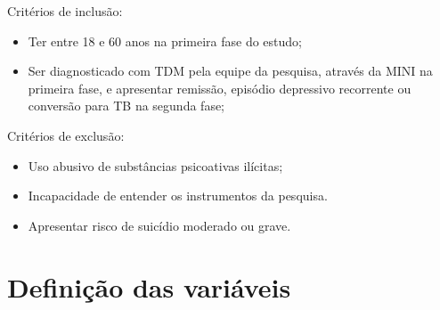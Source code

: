 \documentclass[chapter=TITLE,
               oneside,
               12pt,
               a4paper,
               english,
               brazil]{abntex2}    %
\begin{document}
            Critérios de inclusão:

            \begin{itemize}

                \item Ter entre 18 e 60 anos na primeira fase do estudo;

                \item Ser diagnosticado com TDM pela equipe da pesquisa,
                através da MINI na primeira fase, e apresentar remissão,
                episódio depressivo recorrente ou conversão para TB na segunda fase;

            \end{itemize}

            Critérios de exclusão:

            \begin{itemize}

                \item Uso abusivo de substâncias psicoativas ilícitas;

                \item Incapacidade de entender os instrumentos da pesquisa.

                \item Apresentar risco de suicídio moderado ou grave.

    \end{itemize}

    \section{Definição das variáveis}\label{sec:variaveis}
\end{document}
